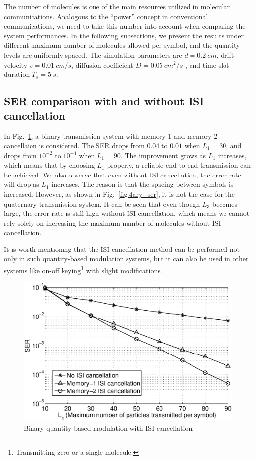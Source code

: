 The number of molecules is one of the main resources utilized in molecular communications.
Analogous to the ``power'' concept in conventional communications, we need to take this number into account when comparing the system performances.
In the following subsections, we present the results under different maximum number of molecules allowed per symbol, and the quantity levels are uniformly spaced.
The simulation parameters are $d = 0.2\ cm$, drift velocity $v = 0.01\ cm/s$, diffusion coefficient $D = 0.05\ cm^2/s$ , and time slot duration $T_s = 5\ s$.

\subsection{SER comparison with and without ISI cancellation}
In Fig.~\ref{fig:binary_ser}, a binary transmission system with memory-1 and memory-2 cancellaion is considered. The SER drops from $0.04$ to $0.01$ when $L_1=30$, and drops from $10^{-2}$ to $10^{-4}$ when $L_1 = 90$. The improvement grows as $L_1$ increases, which means that by choosing $L_1$ properly, a reliable end-to-end transmission can be achieved. We also observe that even without ISI cancellation, the error rate will drop as $L_1$ increases. The reason is that the spacing between symbols is increased. However, as shown in Fig.~\ref{fig:4ary_ser}, it is not the case for the quaternary transmission system. It can be seen that even though $L_3$ becomes large, the error rate is still high without ISI cancellation, which means we cannot rely solely on increasing the maximum number of molecules without ISI cancellation.

It is worth mentioning that the ISI cancellation method can be performed not only in such quantity-based modulation systems, but it can also be used in other systems like on-off keying\footnote{Transmitting zero or a single molecule.}
with slight modifications.

\begin{figure}[htb]
\centering
\includegraphics[width=5.5in, keepaspectratio]{QM/binary_ser_0322.eps}
\caption{Binary quantity-based modulation with ISI cancellation.} \label{fig:binary_ser}
\end{figure}

